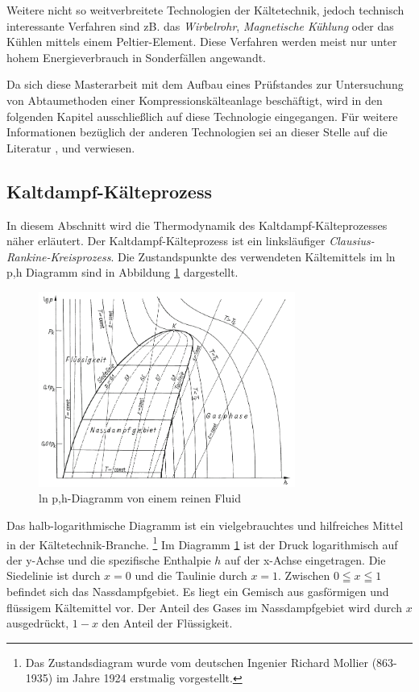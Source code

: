 Weitere nicht so weitverbreitete Technologien der Kältetechnik, jedoch technisch interessante Verfahren  sind zB. das  \textit{Wirbelrohr},  \textit{Magnetische Kühlung} oder das Kühlen mittels einem Peltier-Element. Diese Verfahren werden meist nur unter hohem Energieverbrauch in Sonderfällen angewandt. \citep{Grote2014}

Da sich diese Masterarbeit mit dem Aufbau eines Prüfstandes zur Untersuchung von Abtaumethoden einer Kompressionskälteanlage beschäftigt, wird in den folgenden Kapitel ausschließlich auf diese Technologie eingegangen. Für weitere Informationen bezüglich der anderen Technologien sei an dieser Stelle auf die Literatur \citep{Baehr2013}, \citep{Grote2014} und \citep{Grote2014} verwiesen.


\subsection{Kaltdampf-Kälteprozess}
\label{subsec:Kaltdampf-Kälteprozess}

In diesem Abschnitt wird die Thermodynamik des Kaltdampf-Kälteprozesses näher erläutert. Der Kaltdampf-Kälteprozess ist ein linksläufiger \textit{Clausius-Rankine-Kreisprozess}. Die Zustandspunkte des verwendeten Kältemittels im ln p,h Diagramm sind in Abbildung \ref{fig:Schema p-h-Diagramm} dargestellt. 

\begin{figure}[htb]
\centering		
\includegraphics[width=0.75\textwidth]{Pictures/log_p_h_Beahr_Schema.png}
\caption{ln p,h-Diagramm von einem reinen Fluid  \citep{Baehr2013}}
\label{fig:Schema p-h-Diagramm}
\end{figure}

Das halb-logarithmische Diagramm ist ein vielgebrauchtes und hilfreiches Mittel in der Kältetechnik-Branche. 
\footnote{Das Zustandsdiagram wurde vom deutschen Ingenier Richard Mollier (863-1935) im Jahre 1924 erstmalig vorgestellt.} 
Im Diagramm \ref{fig:Schema p-h-Diagramm} ist der Druck logarithmisch auf der y-Achse und die spezifische Enthalpie $h$ auf der x-Achse eingetragen. Die Siedelinie ist durch $x = 0$ und die Taulinie durch $x = 1$. Zwischen $0\leqq x\leqq 1$ befindet sich das Nassdampfgebiet. Es liegt ein Gemisch aus gasförmigen und flüssigem Kältemittel vor. Der Anteil des Gases im Nassdampfgebiet wird durch $x$ ausgedrückt, $1-x$ den Anteil der Flüssigkeit.


